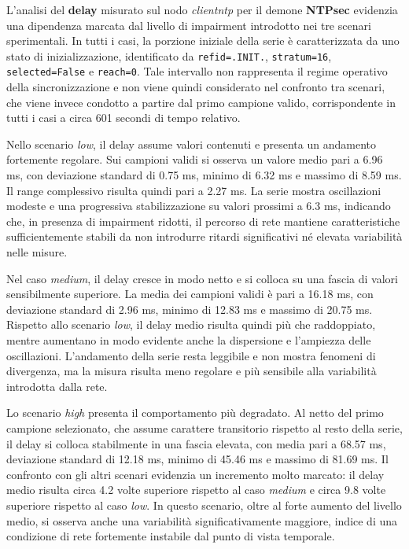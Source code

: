 L’analisi del \textbf{delay} misurato sul nodo \textit{clientntp} per il demone \textbf{NTPsec}
evidenzia una dipendenza marcata dal livello di impairment introdotto nei tre
scenari sperimentali. In tutti i casi, la porzione iniziale della serie è
caratterizzata da uno stato di inizializzazione, identificato da \texttt{refid=.INIT.},
\texttt{stratum=16}, \texttt{selected=False} e \texttt{reach=0}. Tale intervallo
non rappresenta il regime operativo della sincronizzazione e non viene quindi
considerato nel confronto tra scenari, che viene invece condotto a partire dal primo
campione valido, corrispondente in tutti i casi a circa 601 secondi di tempo
relativo.

Nello scenario \textit{low}, il delay assume valori contenuti e presenta un
andamento fortemente regolare. Sui campioni validi si osserva un valore medio pari
a 6.96 ms, con deviazione standard di 0.75 ms, minimo di 6.32 ms e massimo di 8.59
ms. Il range complessivo risulta quindi pari a 2.27 ms. La serie mostra oscillazioni
modeste e una progressiva stabilizzazione su valori prossimi a 6.3 ms, indicando
che, in presenza di impairment ridotti, il percorso di rete mantiene
caratteristiche sufficientemente stabili da non introdurre ritardi significativi
né elevata variabilità nelle misure.

Nel caso \textit{medium}, il delay cresce in modo netto e si colloca su una
fascia di valori sensibilmente superiore. La media dei campioni validi è pari a 16.18
ms, con deviazione standard di 2.96 ms, minimo di 12.83 ms e massimo di 20.75 ms.
Rispetto allo scenario \textit{low}, il delay medio risulta quindi più che
raddoppiato, mentre aumentano in modo evidente anche la dispersione e l’ampiezza delle
oscillazioni. L’andamento della serie resta leggibile e non mostra fenomeni di
divergenza, ma la misura risulta meno regolare e più sensibile alla variabilità introdotta
dalla rete.

Lo scenario \textit{high} presenta il comportamento più degradato. Al netto del primo
campione selezionato, che assume carattere transitorio rispetto al resto della
serie, il delay si colloca stabilmente in una fascia elevata, con media pari a
68.57 ms, deviazione standard di 12.18 ms, minimo di 45.46 ms e massimo di 81.69
ms. Il confronto con gli altri scenari evidenzia un incremento molto marcato: il
delay medio risulta circa 4.2 volte superiore rispetto al caso \textit{medium} e circa
9.8 volte superiore rispetto al caso \textit{low}. In questo scenario, oltre al
forte aumento del livello medio, si osserva anche una variabilità significativamente
maggiore, indice di una condizione di rete fortemente instabile dal punto di
vista temporale.

